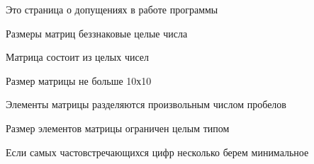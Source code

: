 Это страница о допущениях в работе программы
\begin{DoxyItemize}
\item Размеры матриц беззнаковые целые числа
\item Матрица состоит из целых чисел
\item Размер матрицы не больше 10х10
\item Элементы матрицы разделяются произвольным числом пробелов
\item Размер элементов матрицы ограничен целым типом
\item Если самых частовстречающихся цифр несколько берем минимальное 
\end{DoxyItemize}